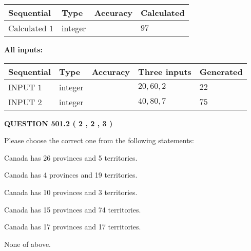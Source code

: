 \documentclass[12pt]{article}
\begin{document}
   
   
   
\noindent{}
   
   
  
  
\noindent\begin{tabular}{|l|l|l|l|}
\hline
 Sequential & Type & Accuracy & Calculated \\ 
\hline
 
 
  Calculated $  1 $ & integer &  & 
  $ 97 $ 
 \\  \hline  
 \end{tabular}
   
   
   
   
\noindent\vspace{0.1in}\hspace{-0.08in} {\textbf{\Large{All inputs: }}}
   
   
  
  
\noindent\begin{tabular}{|l|l|l|l|l|}
\hline
 Sequential & Type & Accuracy & Three inputs & Generated \\ 
\hline
 
 
  INPUT $  1 $ & integer &  & $
 20
 , 
 60
 , 
 2
 $ & $ 22 $ 
 \\  \hline  
 
 
  INPUT $  2 $ & integer &  & $
 40
 , 
 80
 , 
 7
 $ & $ 75 $ 
 \\  \hline  
 \end{tabular}
   
   
  
\vspace{0.2in}
  
{\textbf{\Large{QUESTION
501.2 
 ( 2 , 2 , 3 )
}}}
  
  
Please choose the correct one from the following statements:
 
 
Canada has  26 provinces and  5 territories.
 
 
Canada has   4 provinces and  19 territories.
 
 
Canada has 10  provinces and 3 territories.
 
 
Canada has  15 provinces and  74 territories.
 
 
Canada has  17 provinces and  17 territories.
 
 
 None of above.
 
\end{document}
